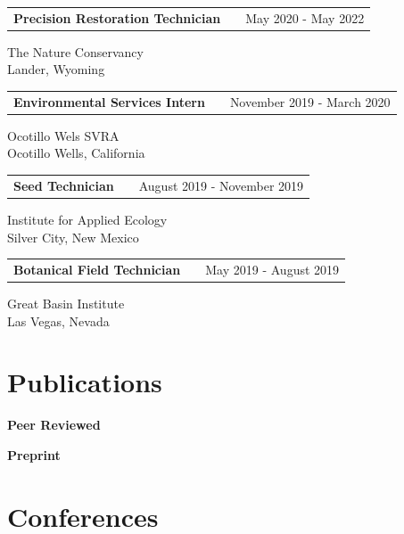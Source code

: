 \documentclass[a4paper,12pt]{article}
\makeatletter
\newenvironment{jobshort}[2]
    {
    \begin{tabularx}{\linewidth}{@{}l X r@{}}
    \textbf{#1} & \hfill &  #2 \\[3.75pt]
    \end{tabularx}
    }
    {
    }
\makeatother
\begin{document}
\begin{jobshort}{Precision Restoration Technician}{May 2020 - May 2022}
    The Nature Conservancy \\ Lander, Wyoming \\
\end{jobshort}

\begin{jobshort}{Environmental Services Intern}{November 2019 - March 2020}
    Ocotillo Wels SVRA \\ Ocotillo Wells, California \\
\end{jobshort}

\begin{jobshort}{Seed Technician}{August 2019 - November 2019}
    Institute for Applied Ecology \\ Silver City, New Mexico \\
\end{jobshort}

\begin{jobshort}{Botanical Field Technician}{May 2019 - August 2019}
    Great Basin Institute \\ Las Vegas, Nevada \\
\end{jobshort}


\section{Publications}

\textbf{Peer Reviewed}

\begin{bibunit}[plainnat]
    \nocite{*}
\end{bibunit}

\textbf{Preprint}

\begin{bibunit}[plainnat]
    \nocite{*}
\end{bibunit}

\section{Conferences}

\begin{bibunit}[plainnat]
    \nocite{*}
\end{bibunit}
\end{document}
